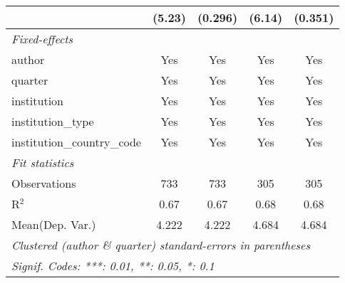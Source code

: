 \begin{tabular}{lcccc}
                                            & (5.23)     & (0.296) & (6.14) & (0.351)\\   
   \midrule
   \emph{Fixed-effects}\\
   author                                   & Yes        & Yes     & Yes    & Yes\\  
   quarter                                  & Yes        & Yes     & Yes    & Yes\\  
   institution                              & Yes        & Yes     & Yes    & Yes\\  
   institution\_type                        & Yes        & Yes     & Yes    & Yes\\  
   institution\_country\_code               & Yes        & Yes     & Yes    & Yes\\  
   \midrule
   \emph{Fit statistics}\\
   Observations                             & 733        & 733     & 305    & 305\\  
   R$^2$                                    & 0.67       & 0.67    & 0.68   & 0.68\\  
Mean(Dep. Var.) & 4.222 & 4.222 & 4.684 & 4.684 \\
   \midrule \midrule
   \multicolumn{5}{l}{\emph{Clustered (author \& quarter) standard-errors in parentheses}}\\
   \multicolumn{5}{l}{\emph{Signif. Codes: ***: 0.01, **: 0.05, *: 0.1}}\\
\end{tabular}
\par\endgroup

